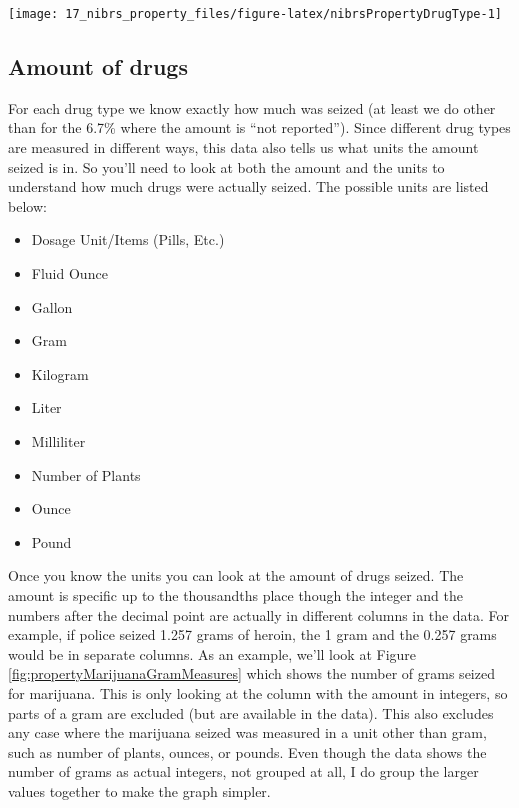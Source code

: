 \documentclass[
]{krantz}
\providecommand{\tightlist}{%
  \setlength{\itemsep}{0pt}\setlength{\parskip}{0pt}}
\let\origfigure\figure
\let\endorigfigure\endfigure
\renewenvironment{figure}[1][2] {
    \expandafter\origfigure\expandafter[H]
} {
    \endorigfigure
}
\begin{document}
\begin{figure}

{\centering \texttt{[image: 17\_nibrs\_property\_files/figure-latex/nibrsPropertyDrugType-1]} 

}

\caption{Annual percent of drug seizures by drug type, for the 1st drug reported, 1991-2022.}\label{fig:nibrsPropertyDrugType}
\end{figure}

\subsection{Amount of drugs}\label{amount-of-drugs}

For each drug type we know exactly how much was seized (at
least we do other than for the 6.7\% where the amount is
``not reported''). Since different drug types are measured
in different ways, this data also tells us what units the
amount seized is in. So you'll need to look at both the
amount and the units to understand how much drugs were
actually seized. The possible units are listed below:

\begin{itemize}
\tightlist
\item
  Dosage Unit/Items (Pills, Etc.)
\item
  Fluid Ounce
\item
  Gallon\\
\item
  Gram
\item
  Kilogram\\
\item
  Liter\\
\item
  Milliliter
\item
  Number of Plants\\
\item
  Ounce
\item
  Pound
\end{itemize}

Once you know the units you can look at the amount of drugs
seized. The amount is specific up to the thousandths place
though the integer and the numbers after the decimal point
are actually in different columns in the data. For example,
if police seized 1.257 grams of heroin, the 1 gram and the
0.257 grams would be in separate columns. As an example,
we'll look at Figure \ref{fig:propertyMarijuanaGramMeasures}
which shows the number of grams seized for marijuana. This
is only looking at the column with the amount in integers,
so parts of a gram are excluded (but are available in the
data). This also excludes any case where the marijuana
seized was measured in a unit other than gram, such as
number of plants, ounces, or pounds. Even though the data
shows the number of grams as actual integers, not grouped at
all, I do group the larger values together to make the graph
simpler.
\end{document}
